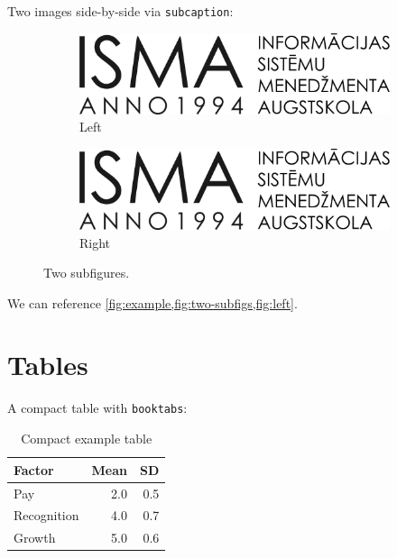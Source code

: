 Two images side-by-side via \texttt{subcaption}:
\begin{figure}[h]
  \centering
  \begin{subfigure}{.47\linewidth}
    \centering
    \includegraphics[width=.9\linewidth]{b_chapters/chapter1/assets/isma_logo.png}
    \caption{Left}
    \label{fig:left}
  \end{subfigure}\hfill
  \begin{subfigure}{.47\linewidth}
    \centering
    \includegraphics[width=.9\linewidth]{b_chapters/chapter1/assets/isma_logo.png}
    \caption{Right}
    \label{fig:right}
  \end{subfigure}
  \caption{Two subfigures.}
  \label{fig:two-subfigs}
\end{figure}

We can reference \cref{fig:example,fig:two-subfigs,fig:left}.

\section{Tables}
A compact table with \texttt{booktabs}:
\begin{table}[h]
  \caption{Compact example table}
  \label{tab:compact}
  \centering
  \begin{tabular}{lrr}
    \toprule
    Factor & Mean & SD\\
    \midrule
    Pay           & 2.0 & 0.5\\
    Recognition   & 4.0 & 0.7\\
    Growth        & 5.0 & 0.6\\
    \bottomrule
  \end{tabular}
\end{table}

